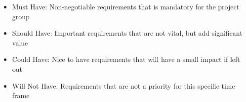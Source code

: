 \begin{itemize}[label={}]
\setlength{\itemsep}{0.05\baselineskip}
    \item {} \normalsize Must Have: \hspace{5mm} Non-negotiable requirements that is mandatory for the project group \par
    \item {} \normalsize Should Have: \hspace{1.8mm} Important requirements that are not vital, but add significant value \par
    \item {} \normalsize Could Have: \hspace{3.5mm} Nice to have requirements that will have a small impact if left out \par
    \item {} \normalsize Will Not Have: Requirements that are not a priority for this specific time frame \par
\end{itemize}

\vspace{4mm}

